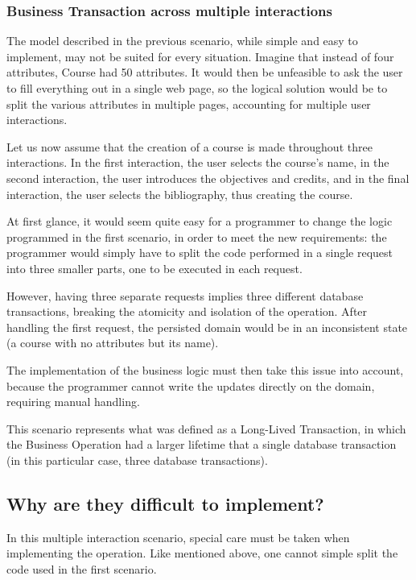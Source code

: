 \documentclass{llncs}
\begin{document}
\subsubsection{Business Transaction across multiple interactions}

The model described in the previous scenario, while simple and easy to
implement, may not be suited for every situation. Imagine that instead
of four attributes, Course had 50 attributes. It would then be
unfeasible to ask the user to fill everything out in a single web
page, so the logical solution would be to split the various attributes
in multiple pages, accounting for multiple user interactions.

Let us now assume that the creation of a course is made throughout
three interactions. In the first interaction, the user selects the
course's name, in the second interaction, the user introduces the
objectives and credits, and in the final interaction, the user selects
the bibliography, thus creating the course.

At first glance, it would seem quite easy for a programmer to change
the logic programmed in the first scenario, in order to meet the new
requirements: the programmer would simply have to split the code
performed in a single request into three smaller parts, one to be
executed in each request.

However, having three separate requests implies three different
database transactions, breaking the atomicity and isolation of the
operation. After handling the first request, the persisted domain
would be in an inconsistent state (a course with no attributes but its
name).

The implementation of the business logic must then take this issue
into account, because the programmer cannot write the updates directly
on the domain, requiring manual handling.

This scenario represents what was defined as a Long-Lived Transaction,
in which the Business Operation had a larger lifetime that a single
database transaction (in this particular case, three database
transactions).

\subsection{Why are they difficult to implement?}
\label{sec:difficult}

In this multiple interaction scenario, special care must be taken when
implementing the operation. Like mentioned above, one cannot simple
split the code used in the first scenario.
\end{document}
